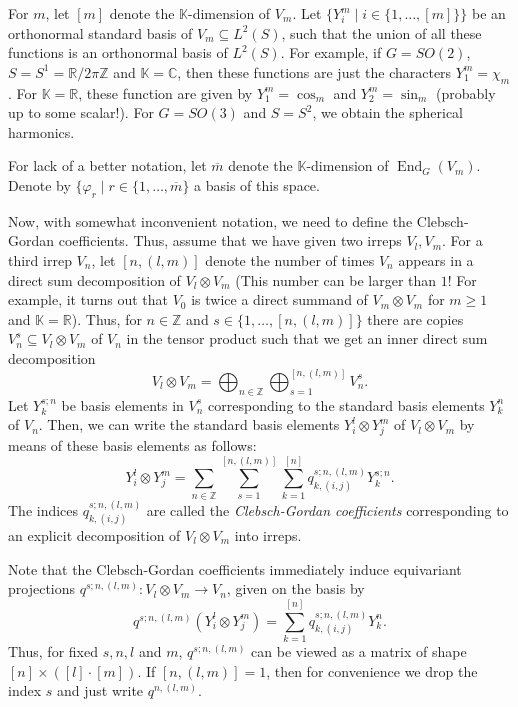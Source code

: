 \documentclass[12pt, a4paper]{article}
\theoremstyle{plain}
\theoremstyle{definition}
\theoremstyle{remark}
\newcommand{\Z}{\mathds{Z}}
\newcommand{\R}{\mathds{R}}
\newcommand{\C}{\mathds{C}}
\newcommand{\K}{\mathds{K}}
\DeclareMathOperator{\End}{End}
\begin{document}
For $m$, let $[m]$ denote the $\K$-dimension of $V_m$. Let $\{Y^m_i \mid i \in \{1, \dots, [m] \}\}$ be an orthonormal standard basis of $V_m \subseteq L^2(S)$, such that the union of all these functions is an orthonormal basis of $L^2(S)$. For example, if $G = SO(2)$, $S = S^1 = \R/{2\pi\Z}$ and $\K = \C$, then these functions are just the characters $Y^m_1 = \chi_{m}$. For $\K = \R$, these function are given by $Y^m_1 = \cos_m$ and $Y^m_2 = \sin_m$ (probably up to some scalar!). For $G = SO(3)$ and $S = S^2$, we obtain the spherical harmonics.

For lack of a better notation, let $\overline{m}$ denote the $\K$-dimension of $\End_G(V_m)$. Denote by $\{ \varphi_r \mid r \in \{1 ,\dots, \overline{m} \}$ a basis of this space.

Now, with somewhat inconvenient notation, we need to define the Clebsch-Gordan coefficients. Thus, assume that we have given two irreps $V_l, V_m$. For a third irrep $V_n$, let $[n,(l,m)]$ denote the number of times $V_n$ appears in a direct sum decomposition of $V_l \otimes V_m$ (This number can be larger than $1$! For example, it turns out that $V_0$ is twice a direct summand of $V_m \otimes V_m$ for $m \geq 1$ and $\K = \R$). Thus, for $n \in \Z$ and $s \in \{1, \dots, [n,(l,m)]\}$ there are copies $V_n^s \subseteq V_l \otimes V_m$ of $V_n$ in the tensor product such that we get an inner direct sum decomposition
\begin{equation*}
V_l \otimes V_m = \bigoplus_{n \in \Z} \bigoplus_{s = 1}^{[n,(l,m)]} V_n^s.
\end{equation*}
Let $Y_k^{s;n}$ be basis elements in $V_n^s$ corresponding to the standard basis elements $Y_k^n$ of $V_n$. Then, we can write the standard basis elements $Y_i^l \otimes Y_j^m$ of $V_l \otimes V_m$ by means of these basis elements as follows:
\begin{equation*}
Y_i^l \otimes Y_j^m = \sum_{n \in \Z} \sum_{s = 1}^{[n, (l,m) ]} \sum_{k = 1}^{[n]} q_{k,(i,j)}^{s; n, (l,m)}Y_k^{s; n}.
\end{equation*}
The indices $q_{k,(i,j)}^{s;n,(l,m)}$ are called the \emph{Clebsch-Gordan coefficients} corresponding to an explicit decomposition of $V_l \otimes V_m$ into irreps.

Note that the Clebsch-Gordan coefficients immediately induce equivariant projections $q^{s;n,(l,m)}: V_l \otimes V_m \to V_n$, given on the basis by
\begin{equation*}
q^{s;n,(l,m)}(Y^l_i \otimes Y^m_j) = \sum_{k = 1}^{[n]} q_{k,(i,j)}^{s;n,(l,m)} Y_k^{n}.
\end{equation*}
Thus, for fixed $s,n,l$ and $m$, $q^{s;n,(l,m)}$ can be viewed as a matrix of shape $[n]\times ([l]\cdot [m])$. If $[n,(l,m)] = 1$, then for convenience we drop the index $s$ and just write $q^{n,(l,m)}$.
\end{document}
